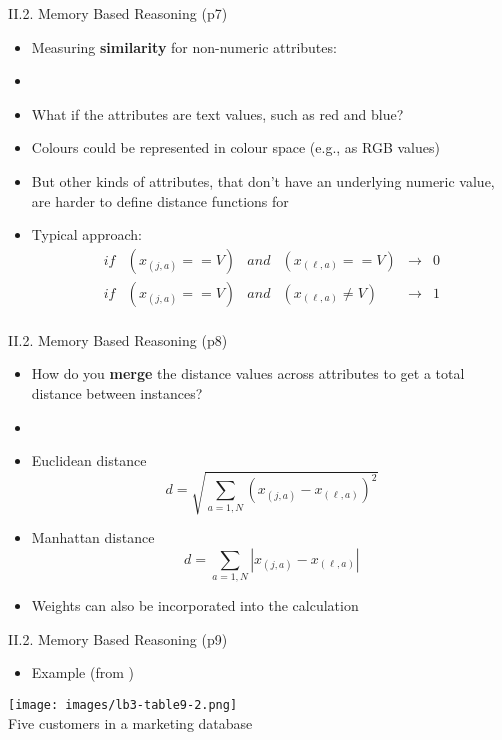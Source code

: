 \documentclass[handout]{beamer}
\newcommand{\strong}[1]{\textbf{\color{teal} #1}}
\begin{document}
\begin{frame}{II.2. Memory Based Reasoning (p7)}
\begin{itemize}
\item[] Measuring \strong{similarity} for non-numeric attributes:
\item[]
\item What if the attributes are text values, such as {\color{red}red} and {\color{blue}blue}?
\item Colours could be represented in colour space (e.g., as RGB values)
\item But other kinds of attributes, that don't have an underlying numeric value, are harder to define distance functions for
\item Typical approach:
\[
\begin{array}{lccccl}
	if & (x_{(j,a)}==V) & and & (x_{(\ell,a)}==V)    & \rightarrow & 0 \\
	if & (x_{(j,a)}==V) & and & (x_{(\ell,a)} \ne V) & \rightarrow & 1 \\
\end{array}
\]
\end{itemize}
\end{frame}
\begin{frame}{II.2. Memory Based Reasoning (p8)}
\begin{itemize}
\item[] How do you \strong{merge} the distance values across attributes to get a total distance between instances?
\item[]
\item Euclidean distance
\[
	d = \sqrt{ \sum_{a=1,N}{ \left( x_{(j,a)} - x_{(\ell,a)} \right) ^2 }}
\]
\item Manhattan distance
\[
	d = \sum_{a=1,N}{ \left| x_{(j,a)} - x_{(\ell,a)} \right| }
\]
\item Weights can also be incorporated into the calculation
\end{itemize}
\end{frame}
\begin{frame}{II.2. Memory Based Reasoning (p9)}
\begin{itemize}
\item Example (from \cite[ch.9]{LB3:2011})
\end{itemize}
\begin{center}
\texttt{[image: images/lb3-table9-2.png]}\\
Five customers in a marketing database~\cite[Table 9.2]{LB3:2011}
\end{center}
\end{frame}
\end{document}
